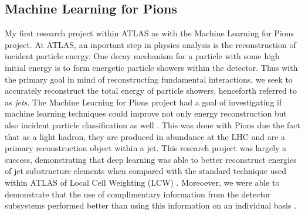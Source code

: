 \documentclass[12pt]{article}
\begin{document}


\subsection{Machine Learning for Pions}
My first research project within ATLAS as with the Machine Learning for Pions
project. At ATLAS, an inportant step in physics analysis is the reconstruction
of incident particle energy. One decay mechanism for a particle with some high
initial energy is to form energetic particle showers within the detector. Thus
with the primary goal in mind of reconstructing fundamental interactions, we
seek to accurately reconstruct the total energy of particle showers, henceforth
referred to as \textit{jets}. The Machine Learning for Pions project had a goal
of investigating if machine learning techniques could improve not only energy
reconstruction but also incident particle classification as well
\cite{ml4p_prelim}. This was done with Pions due the fact that as a light
hadron, they are produced in abundance at the LHC and are a primary
reconstruction object within a jet. This research project was largely a success,
demonstrating that deep learning was able to better reconstruct energies of jet
substructure elements when compared with the standard technique used within
ATLAS of Local Cell Weighting (LCW) \cite{ml4p}. Moreoever, we were able to
demonstrate that the use of complimentary information from the detector
subsystems performed better than using this information on an individual basis
\cite{ml4p}.
\end{document}
